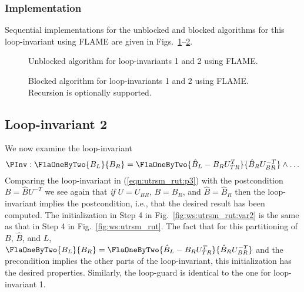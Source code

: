 \subsubsection{Implementation}

Sequential implementations for the unblocked and blocked algorithms
for this loop-invariant using FLAME are given in
Figs.~\ref{fig:trsm_rut_lazy_unb}--\ref{fig:trsm_rut_lazy_blk}.

\begin{figure}[htbp]
\footnotesize
\begin{quote}
\end{quote}
\caption{Unblocked algorithm for loop-invariants 1 and 2 using FLAME.}
\label{fig:trsm_rut_lazy_unb}
\end{figure}

\begin{figure}[htbp]
\footnotesize
{}%
\begin{quote}
\end{quote}
\caption{Blocked algorithm for loop-invariants 1 and 2 using FLAME.
Recursion is optionally supported.}
\label{fig:trsm_rut_lazy_blk}
\end{figure}

\subsection{Loop-invariant 2}

We now examine the loop-invariant
\begin{equation}
\label{eqn:utrsm_rut:p3}
\PInv: 
\FlaOneByTwo{ B_L}{B_R} =
\FlaOneByTwo{ \hat{B}_{L} - B_{R} U_{TR}^{T} }
            { \hat{B}_{R} U_{BR}^{-T}        }
\wedge
\ldots
\end{equation}
Comparing the loop-invariant in (\ref{eqn:utrsm_rut:p3}) with the
postcondition $ B = \hat{B} U^{-T} $ we see again that {\em if} $U=U_{BR}$,
$ B = B_R $, and $ \hat{B} = \hat{B}_R $ then the loop-invariant
implies the postcondition, i.e., that the desired result has been
computed.
%
The initialization in Step 4 in Fig.~\ref{fig:ws:utrsm_rut:var2}
is the same as that in Step 4 in Fig.~\ref{fig:ws:utrsm_rut}.
The fact that for this partitioning of $ B $, $ \hat{B} $, and $ L $,
$
\FlaOneByTwo{ B_L}{B_R} =
\FlaOneByTwo{ \hat{B}_{L} - B_{R} U_{TR}^{T} }
            { \hat{B}_{R} U_{BR}^{-T}        }
$
and the precondition implies the other parts of
the loop-invariant, this initialization has
the desired properties.
%
Similarly, the loop-guard is identical to
the one for loop-invariant 1.


